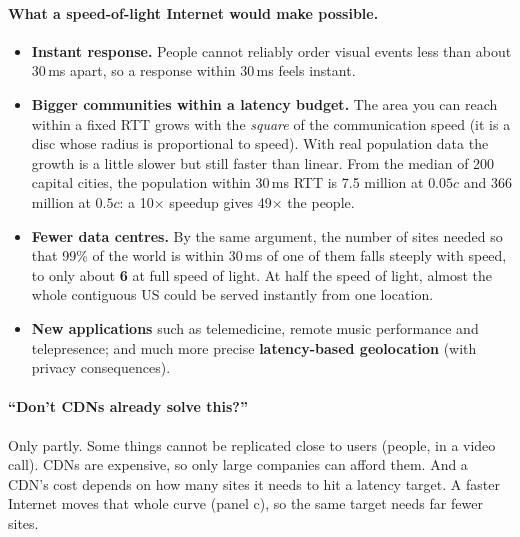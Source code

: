 \paragraph{What a speed-of-light Internet would make possible.}
\begin{itemize}
  \item \textbf{Instant response.} People cannot reliably order visual events less than about 30\,ms apart, so a response within 30\,ms feels instant.
  \item \textbf{Bigger communities within a latency budget.} The area you can reach within a fixed RTT grows with the \emph{square} of the
        communication speed (it is a disc whose radius is proportional to speed). With real population data the growth is a little slower but still faster than
        linear. From the median of 200 capital cities, the population within 30\,ms RTT is 7.5 million at $0.05c$ and 366 million at $0.5c$: a 10$\times$ speedup gives 49$\times$ the people.
  \item \textbf{Fewer data centres.} By the same argument, the number of sites needed so that 99\% of the world is within 30\,ms of one of them falls steeply
        with speed, to only about \textbf{6} at full speed of light. At half the speed of light, almost the whole contiguous US could be served instantly from one location.
  \item \textbf{New applications} such as telemedicine, remote music performance and telepresence; and much more precise \textbf{latency-based geolocation} (with privacy consequences).
\end{itemize}


\paragraph{``Don't CDNs already solve this?''} Only partly. Some things cannot be replicated close to users (people, in a video call). CDNs are
expensive, so only large companies can afford them. And a CDN's cost depends on how many sites it needs to hit a latency target. A faster Internet moves that
whole curve (panel c), so the same target needs far fewer sites.

